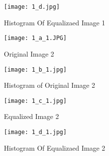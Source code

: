 \documentclass[12pt]{report}
\begin{document}
\begin{center}
\begin{enumerate}
\begin{figure}[h]
\texttt{[image: 1\_d.jpg]}
\caption{Histogram Of Equalizaed Image 1}
\end{figure}


\begin{figure}[h]
\texttt{[image: 1\_a\_1.JPG]}
\caption{Original Image 2}
\end{figure}

\begin{figure}[h]
\texttt{[image: 1\_b\_1.jpg]}
\caption{Histogram of Original Image 2}
\end{figure}


\begin{figure}[h]
\texttt{[image: 1\_c\_1.jpg]}
\caption{Equalized Image 2}
\end{figure}



\begin{figure}[h]
\texttt{[image: 1\_d\_1.jpg]}
\caption{Histogram Of Equalizaed Image 2}
\end{figure}


\pagebreak



\end{enumerate}
\end{center}
\end{document}
